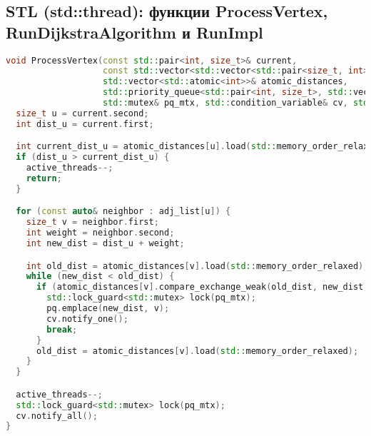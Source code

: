 \documentclass[12pt]{article}
\begin{document}
\subsection*{STL (std::thread): функции ProcessVertex, RunDijkstraAlgorithm и RunImpl}
\begin{lstlisting}[language=C++]
void ProcessVertex(const std::pair<int, size_t>& current,
                   const std::vector<std::vector<std::pair<size_t, int>>>& adj_list,
                   std::vector<std::atomic<int>>& atomic_distances,
                   std::priority_queue<std::pair<int, size_t>, std::vector<std::pair<int, size_t>>, std::greater<>>& pq,
                   std::mutex& pq_mtx, std::condition_variable& cv, std::atomic<int>& active_threads) {
  size_t u = current.second;
  int dist_u = current.first;

  int current_dist_u = atomic_distances[u].load(std::memory_order_relaxed);
  if (dist_u > current_dist_u) {
    active_threads--;
    return;
  }

  for (const auto& neighbor : adj_list[u]) {
    size_t v = neighbor.first;
    int weight = neighbor.second;
    int new_dist = dist_u + weight;

    int old_dist = atomic_distances[v].load(std::memory_order_relaxed);
    while (new_dist < old_dist) {
      if (atomic_distances[v].compare_exchange_weak(old_dist, new_dist, std::memory_order_relaxed)) {
        std::lock_guard<std::mutex> lock(pq_mtx);
        pq.emplace(new_dist, v);
        cv.notify_one();
        break;
      }
      old_dist = atomic_distances[v].load(std::memory_order_relaxed);
    }
  }

  active_threads--;
  std::lock_guard<std::mutex> lock(pq_mtx);
  cv.notify_all();
}
\end{lstlisting}
\end{document}
